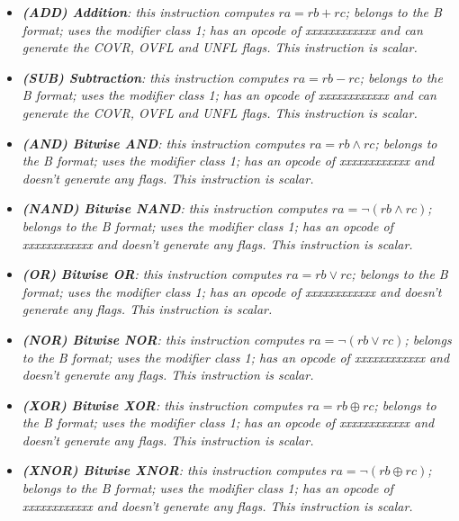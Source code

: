         \begin{multicols}{2}

            \begin{itemize}

                \item \textit{\textbf{(ADD) Addition}: this instruction computes \(ra = rb + rc\); belongs to the B format; uses the modifier class 1; has an opcode of xxxxxxxxxxxx and can generate the COVR, OVFL and UNFL flags. This instruction is scalar.}

                \item \textit{\textbf{(SUB) Subtraction}: this instruction computes \(ra = rb - rc\); belongs to the B format; uses the modifier class 1; has an opcode of xxxxxxxxxxxx and can generate the COVR, OVFL and UNFL flags. This instruction is scalar.}

                \item \textit{\textbf{(AND) Bitwise AND}: this instruction computes \(ra = rb \wedge rc\); belongs to the B format; uses the modifier class 1; has an opcode of xxxxxxxxxxxx and doesn't generate any flags. This instruction is scalar.}

                \item \textit{\textbf{(NAND) Bitwise NAND}: this instruction computes \(ra = \neg(rb \wedge rc)\); belongs to the B format; uses the modifier class 1; has an opcode of xxxxxxxxxxxx and doesn't generate any flags. This instruction is scalar.}

                \item \textit{\textbf{(OR) Bitwise OR}: this instruction computes \(ra = rb \vee rc\); belongs to the B format; uses the modifier class 1; has an opcode of xxxxxxxxxxxx and doesn't generate any flags. This instruction is scalar.}

                \item \textit{\textbf{(NOR) Bitwise NOR}: this instruction computes \(ra = \neg(rb \vee rc)\); belongs to the B format; uses the modifier class 1; has an opcode of xxxxxxxxxxxx and doesn't generate any flags. This instruction is scalar.}

                \item \textit{\textbf{(XOR) Bitwise XOR}: this instruction computes \(ra = rb \oplus rc\); belongs to the B format; uses the modifier class 1; has an opcode of xxxxxxxxxxxx and doesn't generate any flags. This instruction is scalar.}

                \item \textit{\textbf{(XNOR) Bitwise XNOR}: this instruction computes \(ra = \neg(rb \oplus rc)\); belongs to the B format; uses the modifier class 1; has an opcode of xxxxxxxxxxxx and doesn't generate any flags. This instruction is scalar.}


\end{itemize}
\end{multicols}
